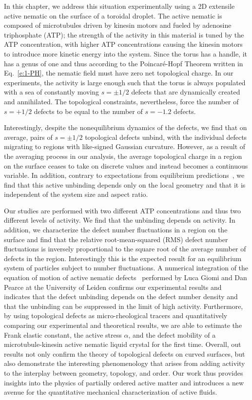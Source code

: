 In this chapter, we address this situation experimentally using a 2D extensile active nematic on the surface of a toroidal droplet.
The active nematic is composed of microtubules driven by kinesin motors and fueled by adenosine triphosphate (ATP); the strength of the activity in this material is tuned by the ATP concentration, with higher ATP concentrations causing the kinesin motors to introduce more kinetic energy into the system.
Since the torus has a handle, it has a genus of one and thus according to the Poincar\'e-Hopf Theorem written in Eq.~\ref{e:1-PH}, the nematic field must have zero net topological charge.
In our experiments, the activity is large enough such that the torus is always populated with a sea of constantly moving $s = \pm 1/2$ defects that are dynamically created and annihilated.
The topological constraints, nevertheless, force the number of $s = +1/2$ defects to be equal to the number of $s = -1.2$ defects.

Interestingly, despite the nonequilibrium dynamics of the defects, we find that on average, pairs of $s = \pm 1/2$ topological defects unbind, with the individual defects migrating to regions with like-signed Gaussian curvature.
However, as a result of the averaging process in our analysis, the average topological charge in a region on the surface ceases to take on discrete values and instead becomes a continuous variable.
In addition, contrary to expectations from equilibrium predictions~\cite{RN36,RN19,RN22,RN20,RN78}, we find that this active unbinding depends only on the local geometry and that it is independent of the system size and aspect ratio.

Our studies are performed with two different ATP concentrations and thus two different levels of activity.
We find that the unbinding depends on activity.
In addition, we characterize the defect number fluctuations in a region on the surface and find that the relative root-mean-squared (RMS) defect number fluctuations is inversely proportional to the square root of the average number of defects in the region.
Interestingly this is the expected result for an equilibrium system of particles subject to number fluctuations.
A numerical integration of the equation of motion of active nematic defects~\cite{RN11,RN8,RN9} performed by Luca Giomi and Dan Pearce at the University of Leiden confirms our experimental results and indicates that the defect unbinding depends on the defect number density and that the unbinding can be suppressed in the limit of high activity.
Furthermore, by using topological defects as micro-rheological tracers and quantitatively comparing our experimental and theoretical results, we are able to estimate the Frank elastic constant, the active stress $\alpha$, and the defect mobility of a microtubule-kinesin active nematic liquid crystal for the first time.
Overall, out results not only confirm the theory of topological defects on curved surfaces, but also demonstrate the interesting phenomenology that arises from adding activity to the interplay between geometry, topology, and order.
Our work thus provides insights into the physics of partially ordered active matter and introduces a new avenue for the quantitative mechanical characterization of active fluids.


